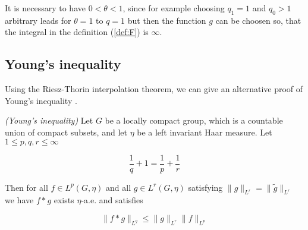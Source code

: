 \begin{remark}
	It is necessary to have $0 < \theta < 1$, since for example choosing $q_1 = 1$ and $q_0 > 1$ arbitrary leads for $\theta = 1$ to $q = 1$ but then the function $g$ can be choosen so, that the integral in the definition \textup{(\ref{def:F})} is $\infty$.
\end{remark}


\subsection{Young's inequality}
Using the Riesz-Thorin interpolation theorem, we can give an alternative proof of Young's inequality \cite[22--23]{grafakos:fourier:2014}.

\vspace{2mm}

\begin{mdframed}
	\begin{theorem}\emph{(Young's inequality)}
		Let $G$ be a locally compact group, which is a countable union of compact subsets, and let $\eta$ be a left invariant Haar measure. Let $1 \leqslant p,q,r \leqslant \infty$

		\begin{equation}
			\frac{1}{q} + 1 = \frac{1}{p} + \frac{1}{r}
		\end{equation}

		Then for all $f \in L^p(G,\eta)$ and all $g \in L^r(G,\eta)$ satisfying $\|g\|_{L^r} = \|\tilde{g}\|_{L^r}$ we have $f \ast g$ exists $\eta$-a.e. and satisfies

		\begin{equation}
			\|f \ast g\|_{L^q} \leqslant \|g\|_{L^r}\|f\|_{L^p}
		\end{equation}
	\end{theorem}
\end{mdframed}

